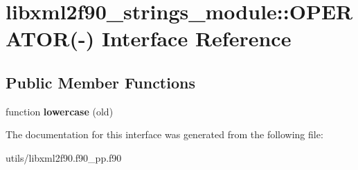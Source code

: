 \hypertarget{interfacelibxml2f90__strings__module_1_1OPERATOR_07-_08}{
\section{libxml2f90\_\-strings\_\-module::OPERATOR(-\/) Interface Reference}
\label{interfacelibxml2f90__strings__module_1_1OPERATOR_07-_08}
}
\subsection*{Public Member Functions}
\begin{DoxyCompactItemize}
\item 
\hypertarget{interfacelibxml2f90__strings__module_1_1OPERATOR_07-_08_a795d3aeaf277a7be718baef5fe0647fe}{
function {\bfseries lowercase} (old)}
\label{interfacelibxml2f90__strings__module_1_1OPERATOR_07-_08_a795d3aeaf277a7be718baef5fe0647fe}

\end{DoxyCompactItemize}


The documentation for this interface was generated from the following file:\begin{DoxyCompactItemize}
\item 
utils/libxml2f90.f90\_\-pp.f90\end{DoxyCompactItemize}
